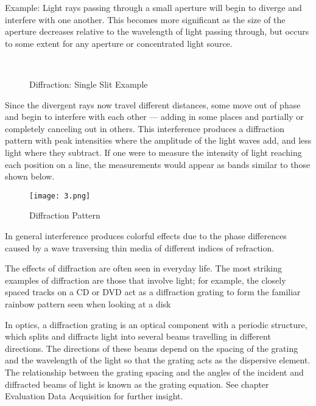Example:
Light rays passing through a small aperture will begin to diverge and interfere with one another. This becomes more significant as the size of the aperture decreases relative to the wavelength of light passing through, but occurs to some extent for any aperture or concentrated light source.


\begin{figure}[H]
  \centering
~
  \label{diffractionSingleSlitExample}
  \caption{Diffraction: Single Slit Example}
\end{figure}


Since the divergent rays now travel different distances, some move out of phase and begin to interfere with each other — adding in some places and partially or completely canceling out in others. This interference produces a diffraction pattern with peak intensities where the amplitude of the light waves add, and less light where they subtract. If one were to measure the intensity of light reaching each position on a line, the measurements would appear as bands similar to those shown below.

\begin{figure}[H]
  \centering
  \texttt{[image: 3.png]}
  \label{diffractionSingleSlitPattern}
  \caption{Diffraction Pattern}
\end{figure}

In general interference produces colorful effects due to the phase differences caused by a wave traversing thin media of different indices of refraction.

The effects of diffraction are often seen in everyday life. The most striking examples of diffraction are those that involve light; for example, the closely spaced tracks on a CD or DVD act as a diffraction grating to form the familiar rainbow pattern seen when looking at a disk

In optics, a diffraction grating is an optical component with a periodic structure, which splits and diffracts light into several beams travelling in different directions. The directions of these beams depend on the spacing of the grating and the wavelength of the light so that the grating acts as the dispersive element.
The relationship between the grating spacing and the angles of the incident and diffracted beams of light is known as the grating equation. See chapter Evaluation Data Acquisition for further insight.

